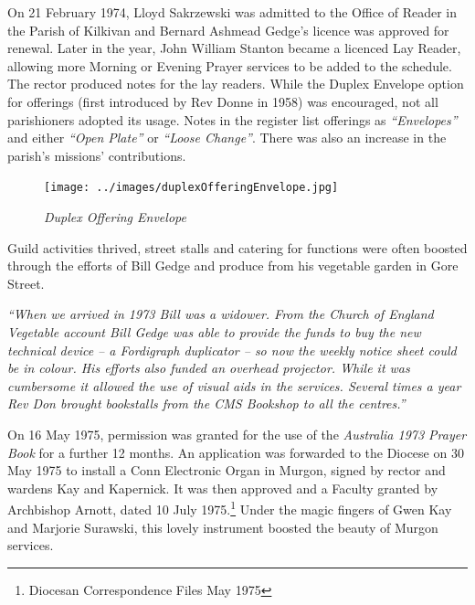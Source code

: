 On 21 February 1974, Lloyd Sakrzewski was admitted to the Office of Reader in the Parish of Kilkivan and Bernard Ashmead Gedge's licence was approved for renewal. Later in the year, John William Stanton became a licenced Lay Reader, allowing more Morning or Evening Prayer services to be added to the schedule. The rector produced notes for the lay readers. While the Duplex Envelope option for offerings (first introduced by Rev Donne in 1958) was encouraged, not all parishioners adopted its usage. Notes in the register list offerings as \emph{``Envelopes''} and either \emph{``Open Plate''} or \emph{``Loose Change''}. There was also an increase in the parish's missions' contributions.









\begin{figure}
\begin{center}
\texttt{[image: ../images/duplexOfferingEnvelope.jpg]}
\caption{\itshape Duplex Offering Envelope}
\end{center}
\end{figure}




Guild activities thrived, street stalls and catering for functions were often boosted through the efforts of Bill Gedge and produce from his vegetable garden in Gore Street.



\emph{``When we arrived in 1973 Bill was a widower. From the Church of England Vegetable account Bill Gedge was able to provide the funds to buy the new technical device -- a Fordigraph duplicator -- so now the weekly notice sheet could be in colour. His efforts also funded an overhead projector. While it was cumbersome it allowed the use of visual aids in the services. Several times a year Rev Don brought bookstalls from the CMS Bookshop to all the centres.''}



On 16 May 1975, permission was granted for the use of the \emph{Australia 1973 Prayer Book} for a further 12 months. An application was forwarded to the Diocese on 30 May 1975 to install a Conn Electronic Organ in Murgon, signed by rector and wardens Kay and Kapernick. It was then approved and a Faculty granted by Archbishop Arnott, dated 10 July 1975.\footnote{Diocesan Correspondence Files May 1975} Under the magic fingers of Gwen Kay and Marjorie Surawski, this lovely instrument boosted the beauty of Murgon services.


